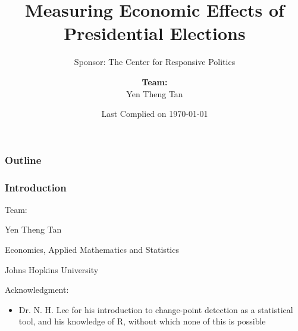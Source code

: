 \documentclass[compress,handout,10pt]{beamer}
\title{{\color{black} \LARGE Measuring Economic Effects of Presidential Elections\newline} }
\subtitle{{\color{black} \large Sponsor: The Center for Responsive Politics} }
\author{ 
    {\bf{Team:}} \\ 
Yen Theng Tan \\ 
    \vspace{5pt}
}
\institute{Department of Applied Mathematics and Statistics, Johns Hopkins University  }
\date{\mygreen Last Complied on \today}
\let\olditem\item
\renewcommand{\item}{\setlength{\itemsep}{0.5\baselineskip}\olditem}
\begin{document}
\begin{frame}[plain]
    \titlepage
\end{frame}

\begin{frame}
    \frametitle{Outline}
    \tableofcontents
\end{frame}

\begin{frame}
\frametitle{Introduction}
\begin{center}
Team:

\vspace{5pt} 

Yen Theng Tan  
\vspace{5pt} 

Economics, Applied Mathematics and Statistics 


\vspace{5pt}

 Johns Hopkins University


\vspace{12pt}
Acknowledgment: 
\end{center}
\begin{itemize}
\item Dr. N. H. Lee for his introduction to change-point detection as a statistical tool, and his knowledge of R, without which none of this is possible
\end{itemize}

\end{frame}
\end{document}
